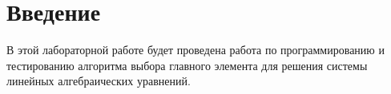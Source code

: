 \section{Введение}
    В этой лабораторной работе будет проведена работа по программированию и тестированию алгоритма выбора главного элемента для решения системы линейных алгебраических уравнений.